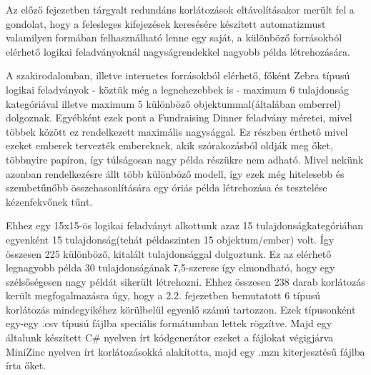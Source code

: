 \documentclass[12pt,a4paper,twoside, openright]{report}
\begin{document}
    Az előző fejezetben tárgyalt redundáns korlátozások eltávolításakor merült fel a gondolat, hogy a felesleges kifejezések keresésére készített automatizmust valamilyen formában felhasználható lenne egy saját, a különböző forrásokból elérhető logikai feladványoknál nagyságrendekkel nagyobb példa létrehozására.
    
    A szakirodalomban, illetve internetes forrásokból elérhető, főként Zebra típusú logikai feladványok - köztük még a legnehezebbek is - maximum 6 tulajdonság kategóriával illetve maximum 5 különböző objektummal(általában emberrel) dolgoznak.
    Egyébként ezek pont a Fundraising Dinner feladvány méretei, mivel többek között ez rendelkezett maximális nagysággal.
    Ez részben érthető mivel ezeket emberek tervezték embereknek, akik szórakozásból oldják meg őket, többnyire papíron, így túlságosan nagy példa részükre nem adható.
    Mivel nekünk azonban rendelkezésre állt több különböző modell, így ezek még hitelesebb és szembetűnőbb összehasonlítására egy óriás példa létrehozása és tesztelése kézenfekvőnek tűnt.
    
    Ehhez egy 15x15-ös logikai feladványt alkottunk azaz 15 tulajdonságkategóriában egyenként 15 tulajdonság(tehát példaszinten 15 objektum/ember) volt.
    Így összesen 225 különböző, kitalált tulajdonsággal dolgoztunk. Ez az elérhető legnagyobb példa 30 tulajdonságának 7,5-szerese így elmondható, hogy egy szélsőségesen nagy példát sikerült létrehozni.
    Ehhez összesen 238 darab korlátozás került megfogalmazásra úgy, hogy a 2.2. fejezetben bemutatott 6 típusú korlátozás mindegyikéhez körülbelül egyenlő számú tartozzon.
    Ezek típusonként egy-egy .csv típusú fájlba speciális formátumban lettek rögzítve.
    Majd egy általunk készített C\# nyelven írt kódgenerátor ezeket a fájlokat végigjárva MiniZinc nyelven írt korlátozásokká alakította, majd egy .mzn kiterjesztésű fájlba írta őket.
    
\end{document}
